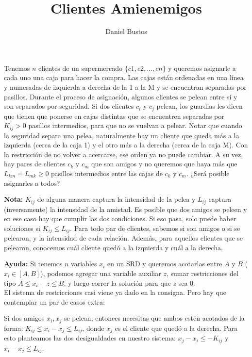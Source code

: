 \documentclass{article}
\title{Clientes Amienemigos}
\author{Daniel Bustos}
\date{}
\begin{document}
\maketitle

Tenemos $n$ clientes de un supermercado $\{c1, c2, ..., cn\}$ y queremos asignarle a cada uno una caja para hacer la compra. Las cajas están ordenadas en una línea y numeradas de izquierda a derecha de la 1 a la M y se encuentran separadas por pasillos. Durante el proceso de asignación, algunos clientes se pelean entre sí y son separados por seguridad. Si dos clientes $c_i$ y $c_j$ pelean, los guardias les dicen que tienen que ponerse en cajas distintas que se encuentren separadas por $K_{ij} > 0$ pasillos intermedios, para que no se vuelvan a pelear. Notar que cuando la seguridad separa una pelea, naturalmente hay un cliente que queda más a la izquierda (cerca de la caja 1) y el otro más a la derecha (cerca de la caja M). Con la restricción de no volver a acercarse, ese orden ya no puede cambiar. A su vez, hay pares de clientes $c_k$ y $c_m$ que son amigos y no queremos que haya más que $L_{km} = L_{mk} \geq 0$ pasillos intermedios entre las cajas de $c_k$ y $c_m$. ¿Será posible asignarles a todos?

\textbf{Nota:} $K_{ij}$ de alguna manera captura la intensidad de la pelea y $L_{ij}$ captura (inversamente) la intensidad de la amistad. Es posible que dos amigos se peleen y en ese caso hay que cumplir las dos condiciones. Si eso pasa, solo puede haber soluciones si $K_{ij} \leq L_{ij}$. Para todo par de clientes, sabemos si son amigos o si se pelearon, y la intensidad de cada relación. Además, para aquellos clientes que se pelearon, conocemos cuál cliente quedó a la izquierda y cuál a la derecha.

\textbf{Ayuda:} Si tenemos $n$ variables $x_i$ en un SRD y queremos acotarlas entre $A$ y $B$ ($x_i \in [A, B]$), podemos agregar una variable auxiliar $z$, sumar restricciones del tipo $A \leq x_i - z \leq B$, y luego correr la solución para que $z$ sea 0.\\


El sistema de restricciones casi viene ya dado en la consigna. Pero hay que contemplar un par de casos extra:

Si dos amigos $x_i, x_j$ se pelean, entonces necesitas que ambos estén acotados de la forma: $K_{ij} \leq x_i - x_j \leq L_{ij}$, donde $x_j$ es el cliente que quedó a la derecha. Para esto planteamos las dos desigualdades en nuestro sistema: $x_j - x_i \leq -K_{ij}$ y $x_i - x_j \leq L_{ij}$.
\end{document}
